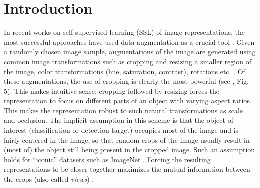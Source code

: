 \section{Introduction}
In recent works on self-supervised learning (SSL) of image representations, the most successful approaches have used data augmentation as a crucial tool \citep{chen2020simple,he2019momentum,grill2020bootstrap,tian2019contrastive,NEURIPS2020_70feb62b}. Given a randomly chosen image sample, augmentations of the image are generated using common image transformations such as cropping and resizing a smaller region of the image, color transformations (hue, saturation, contrast), rotations etc. \citep{chen2020simple,Gidaris2018UnsupervisedRL}. Of these augmentations, the use of cropping is clearly the most powerful (see \cite{chen2020simple}, Fig. 5). This makes intuitive sense: cropping followed by resizing forces the representation to focus on different parts of an object with varying aspect ratios. This makes the representation robust to such natural transformations as scale and occlusion. The implicit assumption in this scheme is that the object of interest (classification or detection target) occupies most of the image and is fairly centered in the image, so that random crops of the image usually result in (most of) the object still being present in the cropped image. Such an assumption holds for ``iconic'' datasets such as ImageNet \cite{NIPS2012_c399862d}. Forcing the resulting representations to be closer together maximizes the mutual information between the crops (also called \textit{views}) \cite{Oord2018RepresentationLW,tian2019contrastive}. %

